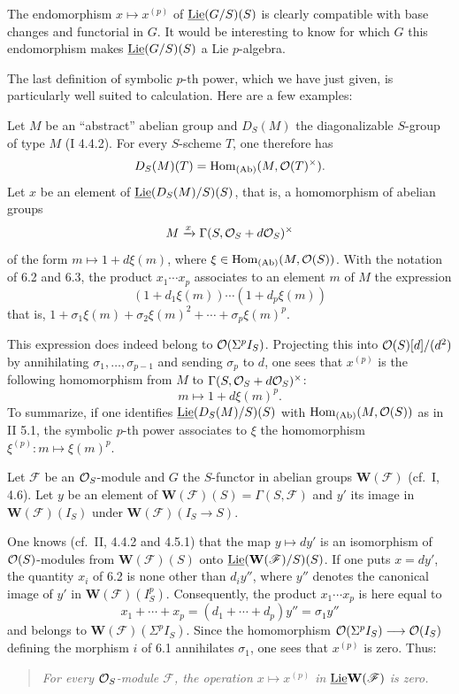 \par
The endomorphism $x\mapsto x^{(p)}$ of $\underline{\operatorname{Lie}}(G/S)(S)$ is clearly compatible with base changes and functorial in $G$. It would be interesting to know for which $G$ this endomorphism makes $\underline{\operatorname{Lie}}(G/S)(S)$ a Lie $p$-algebra.

The last definition of symbolic $p$-th power, which we have just given, is particularly well suited to calculation. Here are a few examples:

Let $M$ be an ``abstract'' abelian group and $D_S(M)$ the diagonalizable $S$-group of type $M$ (I 4.4.2). For every $S$-scheme $T$, one therefore has
\[
D_S(M)(T)=\operatorname{Hom}_{\textup{(Ab)}}(M,\mathcal{O}(T)^\times).
\]
Let $x$ be an element of $\underline{\operatorname{Lie}}(D_S(M)/S)(S)$, that is, a homomorphism of abelian groups
\[
M\xrightarrow{x}\Gamma(S,\mathcal{O}_S+d\mathcal{O}_S)^\times
\]
of the form $m\mapsto1+d\xi(m)$, where $\xi\in\operatorname{Hom}_{\textup{(Ab)}}(M,\mathcal{O}(S))$. With the notation of 6.2 and 6.3, the product $x_1\cdots x_p$ associates to an element $m$ of $M$ the expression
\[
(1+d_1\xi(m))\cdots(1+d_p\xi(m))
\]
that is, $1+\sigma_1\xi(m)+\sigma_2\xi(m)^2+\cdots+\sigma_p\xi(m)^p$.

This expression does indeed belong to $\mathcal{O}(\Sigma^pI_S)$. Projecting this into $\mathcal{O}(S)[d]/(d^2)$ by annihilating $\sigma_1,\ldots,\sigma_{p-1}$ and sending $\sigma_p$ to $d$, one sees that $x^{(p)}$ is the following homomorphism from $M$ to $\Gamma(S,\mathcal{O}_S+d\mathcal{O}_S)^\times$:
\[
m\longmapsto1+d\xi(m)^p.
\]
To summarize, if one identifies $\underline{\operatorname{Lie}}(D_S(M)/S)(S)$ with $\operatorname{Hom}_{\textup{(Ab)}}(M,\mathcal{O}(S))$ as in II 5.1, the symbolic $p$-th power associates to $\xi$ the homomorphism $\xi^{(p)}:m\mapsto\xi(m)^p$.

Let $\mathscr F$ be an $\mathcal{O}_S$-module and $G$ the $S$-functor in abelian groups $\mathbf W(\mathscr F)$ (cf.\ I, 4.6). Let $y$ be an element of $\mathbf W(\mathscr F)(S)=\Gamma(S,\mathscr F)$ and $y'$ its image in $\mathbf W(\mathscr F)(I_S)$ under $\mathbf W(\mathscr F)(I_S\to S)$.

One knows (cf.\ II, 4.4.2 and 4.5.1) that the map $y\mapsto dy'$ is an isomorphism of $\mathcal{O}(S)$-modules from $\mathbf W(\mathscr F)(S)$ onto $\underline{\operatorname{Lie}}(\mathbf W(\mathscr F)/S)(S)$. If one puts $x=dy'$, the quantity $x_i$ of 6.2 is none other than $d_iy''$, where $y''$ denotes the canonical image of $y'$ in $\mathbf W(\mathscr F)(I_S^p)$. Consequently, the product $x_1\cdots x_p$ is here equal to
\[
x_1+\cdots+x_p=(d_1+\cdots+d_p)y''=\sigma_1y''
\]
and belongs to $\mathbf W(\mathscr F)(\Sigma^pI_S)$. Since the homomorphism $\mathcal{O}(\Sigma^pI_S)\longrightarrow\mathcal{O}(I_S)$ defining the morphism $i$ of 6.1 annihilates $\sigma_1$, one sees that $x^{(p)}$ is zero. Thus:
\begin{quote}\emph{For every $\mathcal{O}_S$-module $\mathscr F$, the operation $x\mapsto x^{(p)}$ in $\underline{\operatorname{Lie}}\mathbf W(\mathscr F)$ is zero.}\end{quote}

